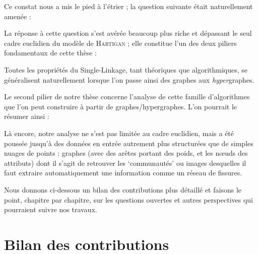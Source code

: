 Ce constat nous a mis le pied à l'étrier ; la question suivante était naturellement amenée :

La réponse à cette question s'est avérée beaucoup plus riche et dépassant le seul cadre euclidien du modèle de \textsc{Hartigan} ; elle constitue l'un des deux piliers fondamentaux de cette thèse :

Toutes les propriétés du Single-Linkage, tant théoriques que algorithmiques, se généralisent naturellement lorsque l'on passe ainsi des graphes aux \emph{hyper}graphes.

Le second pilier de notre thèse concerne l'analyse de cette famille d'algorithmes que l'on peut construire à partir de graphes/hypergraphes. L'on pourrait le résumer ainsi :

Là encore, notre analyse ne s'est pas limitée au cadre euclidien, mais a été poussée jusqu'à des données en entrée autrement plus structurées que de simples nuages de points : graphes (avec des arêtes portant des poids, et les nœuds des attributs) dont il s'agit de retrouver les `communautés' ou images desquelles il faut extraire automatiquement une information comme un réseau de fissures.

Nous donnons ci-dessous un bilan des contributions plus détaillé et faisons le point, chapitre par chapitre, sur les questions ouvertes et autres perspectives qui pourraient suivre nos travaux.

\section{Bilan des contributions}

